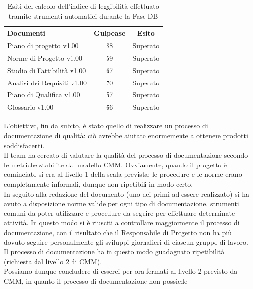 				\begin{table}[H]
					\centering
					\begin{tabu}{| l | c | c |}
							\hline
							Documenti 							& Gulpease	& Esito		\\ \hline \hline
							
							Piano di progetto v1.00				& 88 		& Superato  \\ \hline
							Norme di Progetto v1.00 			& 59		& Superato  \\ \hline
							Studio di Fattibilità v1.00 		& 67		& Superato  \\ \hline
							Analisi dei Requisiti v1.00	 		& 70		& Superato  \\ \hline
							Piano di Qualifica v1.00 			& 57		& Superato  \\ \hline
							Glossario v1.00					 	& 66 		& Superato  \\ \hline
						\end{tabu}
					\caption{Esiti del calcolo dell'indice di leggibilità effettuato tramite strumenti automatici durante la Fase DB}
				\end{table}
				L'obiettivo, fin da subito, è stato quello di realizzare un processo di documentazione di qualità: ciò avrebbe aiutato enormemente a 
				ottenere prodotti soddisfacenti.\\
				Il team ha cercato di valutare la qualità del processo di documentazione secondo le metriche stabilite dal modello CMM. Ovviamente, quando 
				il progetto è cominciato si era al livello 1 della scala prevista: le procedure e le norme erano completamente informali, dunque non 
				ripetibili in modo certo.\\
				In seguito alla redazione del documento  (uno dei primi ad essere realizzato) si ha avuto a disposizione norme 
				valide per ogni tipo di documentazione, strumenti comuni da poter utilizzare e procedure da seguire per effettuare determinate attività. 
				In questo modo si è riusciti a controllare maggiormente il processo di documentazione, con il risultato che il Responsabile di Progetto 
				non ha più dovuto seguire personalmente gli sviluppi giornalieri di ciascun gruppo di lavoro. Il processo di documentazione ha in questo 
				modo guadagnato ripetibilità (richiesta dal livello 2 di CMM).\\
				Possiamo dunque concludere di esserci per ora fermati al livello 2 previsto da CMM, in quanto il processo di documentazione non possiede 
